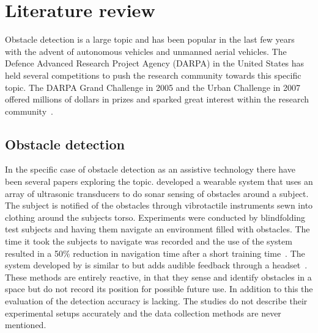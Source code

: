 \documentclass[prodmode,acmtosem]{acmsmall} %
\begin{document}
\section{Literature review} %
Obstacle detection is a large topic and has been popular in the last few years with the advent of autonomous vehicles and unmanned aerial vehicles.
The Defence Advanced Research Project Agency (DARPA) in the United States has held several competitions to push the research community towards this specific topic. The DARPA Grand Challenge in 2005 and the Urban Challenge in 2007 offered millions of dollars in prizes and sparked great interest within the research community~\cite{DARPAGrandChallenge2005,DARPAUrbanChallenge2007}.
\subsection{Obstacle detection}
In the specific case of obstacle detection as an assistive technology there have been several papers exploring the topic. \citet{Cardin2007} developed a wearable system that uses an array of ultrasonic transducers to do sonar sensing of obstacles around a subject. The subject is notified of the obstacles through vibrotactile instruments sewn into clothing around the subjects torso. Experiments were conducted by blindfolding test subjects and having them navigate an environment filled with obstacles. The time it took the subjects to navigate was recorded and the use of the system resulted in a 50\% reduction in navigation time after a short training time~\cite{Cardin2007}. The system developed by \citet{Shin2007} is similar to \citet{Cardin2007} but adds audible feedback through a headset~\cite{Shin2007}. These methods are entirely reactive, in that they sense and identify obstacles in a space but do not record its position for possible future use. In addition to this the evaluation of the detection accuracy is lacking. The studies do not describe their experimental setups accurately and the data collection methods are never mentioned.
\end{document}
